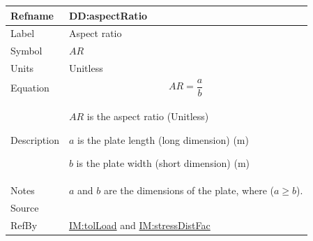 \documentclass[12pt]{article}
\begin{document}
\medskip
\noindent
\begin{minipage}{\textwidth}
\begin{tabular}{>{\raggedright}p{}>{\raggedright\arraybackslash}p{}}
\toprule \textbf{Refname} & \textbf{DD:aspectRatio}
\label{DD:aspectRatio}
\\ \midrule
Label & Aspect ratio
        
\\ \midrule
Symbol & $\mathit{AR}$
         
\\ \midrule
Units & Unitless
        
\\ \midrule
Equation & \begin{displaymath}
           \mathit{AR}=\frac{a}{b}
           \end{displaymath}
\\ \midrule
Description & \begin{symbDescription}
              \item{$\mathit{AR}$ is the aspect ratio (Unitless)}
              \item{$a$ is the plate length (long dimension) (${\text{m}}$)}
              \item{$b$ is the plate width (short dimension) (${\text{m}}$)}
              \end{symbDescription}
\\ \midrule
Notes & $a$ and $b$ are the dimensions of the plate, where ($a\geq{}b$).
        
\\ \midrule
Source & \cite{astm2009}
         
\\ \midrule
RefBy & \hyperref[IM:tolLoad]{IM:tolLoad} and \hyperref[IM:stressDistFac]{IM:stressDistFac}
        
\\ \bottomrule
\end{tabular}
\end{minipage}
\end{document}
